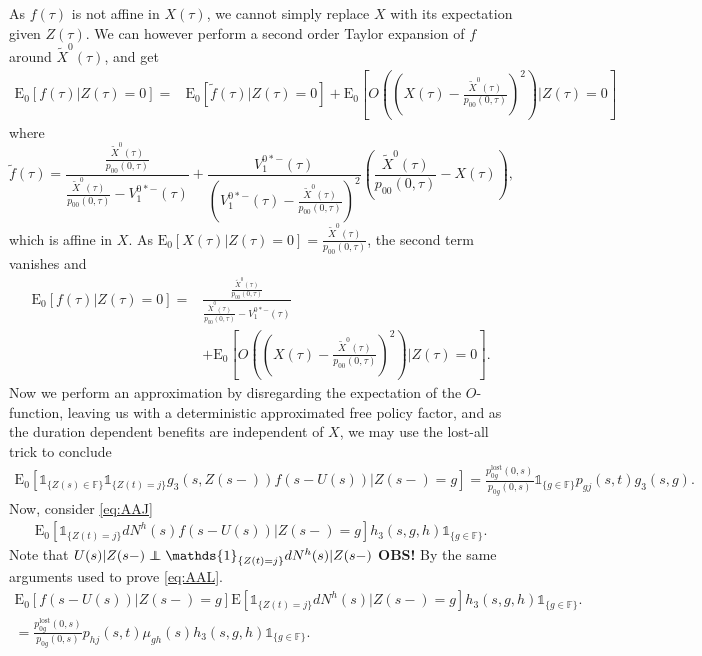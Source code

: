 \documentclass[12pt]{article}
\newcommand{\E}{\text{E}}
\newcommand{\indic}[1]{\mathds{1}_{ \{ #1 \} }}
\newcommand\independent{\protect\mathpalette{\protect\independenT}{\perp}}
\def\independenT#1#2{\mathrel{\rlap{$#1#2$}\mkern2mu{#1#2}}}
\theoremstyle{my_thm}
\begin{document}
As $f(\tau)$ is not affine in $X(\tau)$, we cannot simply replace $X$ with its expectation given $Z(\tau)$. We can however perform a second order Taylor expansion of $f$ around $\tilde{X}^0(\tau)$, and get
\begin{align*}
\E_0[f(\tau) |Z(\tau)=0]
=&
\E_0[\tilde{f}(\tau) |Z(\tau)=0]+ 
\E_0 \left[ O \left( \left( X(\tau)-\frac{\tilde{X}^0(\tau)}{p_{00}(0,\tau)} \right) ^2 \right) \bigg| Z(\tau)=0 \right]
\end{align*}
where 
$$
\tilde{f}(\tau)=
\frac{
	\frac{\tilde{X}^0(\tau)}{p_{00}(0,\tau)}
}{
	\frac{\tilde{X}^0(\tau)}{p_{00}(0,\tau)}
	-V_1^{0*-}(\tau)
}
+
\frac{
	V_1^{0*-}(\tau)
	}{
	\left( V_1^{0*-}(\tau)-
	\frac{\tilde{X}^0(\tau)}{p_{00}(0,\tau)}
	\right)^2
}
\left( \frac{\tilde{X}^0(\tau)}{p_{00}(0,\tau)}-X(\tau)\right),
$$
which is affine in $X$. As $\E_0[X(\tau)|Z(\tau)=0]=\frac{\tilde{X}^0(\tau)}{p_{00}(0,\tau)}$, the second term vanishes and
\begin{align*}
\E_0[f(\tau) |Z(\tau)=0]
=&
\frac{
	\frac{\tilde{X}^0(\tau)}{p_{00}(0,\tau)}
}{
	\frac{\tilde{X}^0(\tau)}{p_{00}(0,\tau)}
	-V_1^{0*-}(\tau)
}
\\
&+
\E_0 \left[ O \left( \left( X(\tau)-\frac{\tilde{X}^0(\tau)}{p_{00}(0,\tau)} \right) ^2 \right) \bigg| Z(\tau)=0 \right].
\end{align*}
Now we perform an approximation by disregarding the expectation of the $O$-function, leaving us with a deterministic approximated free policy factor, and as the duration dependent benefits are independent of $X$, we may use the lost-all trick to conclude
\begin{align*}
\E_0 [ \indic{Z(s) \in \mathbb{F}} \indic{Z(t)=j} g_3(s,Z(s-)) f(s-U(s))|Z(s-)=g]
=
\frac{p^{\text{lost}}_{0g}(0,s)}{p_{0g}(0,s)} \indic{g \in \mathbb{F}} p_{gj}(s,t)g_3(s,g).
\end{align*}
Now, consider \eqref{eq:AAJ}
\begin{align*}
\E_0 [  \indic{Z(t)=j}  dN^h(s) f(s-U(s))|Z(s-)=g] h_3(s,g,h) \indic{g \in \mathbb{F}}.
\end{align*}
Note that $U(s)|Z(s-) \independent \indic{Z(t)=j}dN^h(s)|Z(s-)$ \textbf{OBS!} By the same arguments used to prove \eqref{eq:AAL}.
\begin{align*}
\E_0[f(s-U(s))|Z(s-)=g] \E[ \indic{Z(t)=j}dN^h(s) |Z(s-)=g] h_3(s,g,h) \indic{g \in \mathbb{F}}.
\\
=\frac{p_{0g}^\text{lost}(0,s)}{p_{0g}(0,s)} p_{hj}(s,t) \mu_{gh}(s) h_3(s,g,h) \indic{g \in \mathbb{F}}.
\end{align*}
\end{document}
